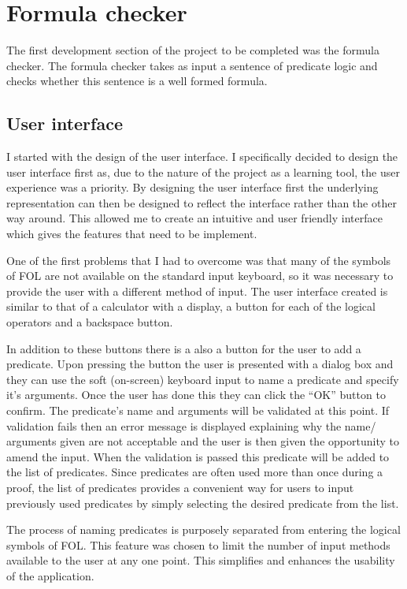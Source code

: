 \chapter{Formula checker}

The first development section of the project to be completed was the formula checker. The formula checker takes as input a sentence of predicate logic and checks whether this sentence is a well formed formula. 
\section{User interface}
I started with the design of the user interface. I specifically decided to design the user interface first as, due to the nature of the project as a learning tool, the user experience was a priority. By designing the user interface first the underlying representation can then be designed to reflect the interface rather than the other way around. This allowed me to create an intuitive and user friendly interface which gives the features that need to be implement. 

One of the first problems that I had to overcome was that many of the symbols of FOL are not available on the standard input keyboard, so it was necessary to provide the user with a different  method of input. The user interface created is similar to that of a calculator with a display, a button for each of the  logical operators and a backspace button.

In addition to these buttons there is a also a button for the user to add a predicate.	 Upon pressing the button the user is presented with a dialog box and they can use the soft (on-screen) keyboard input to name a predicate and specify it's arguments. Once the user has done this they can click the “OK” button to confirm. The predicate's name and arguments will be validated at this point. If validation fails then an error message is displayed explaining why the name/ arguments given are not acceptable and the user is then given the opportunity to amend the input. When the validation is passed this predicate will be added to the list of predicates. Since predicates are often used more than once during a proof, the list of predicates provides a convenient way for users to input previously used predicates by simply selecting the desired predicate from the list.

The process of naming predicates is purposely separated from entering the logical symbols of FOL. This feature was chosen to limit the number of input methods available to the user at any one point. This simplifies and enhances the usability of the application.

